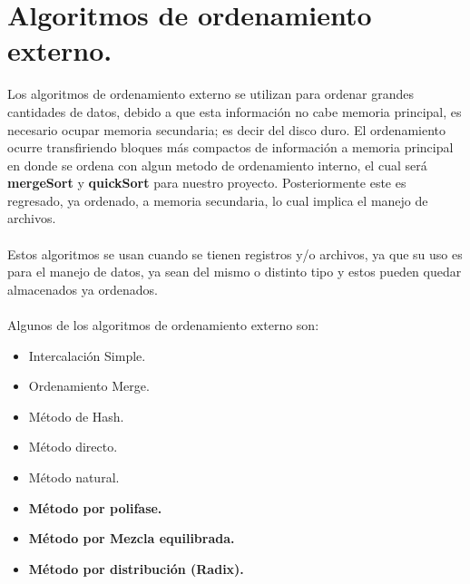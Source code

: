 \documentclass[12pt,letterpaper]{report}
\begin{document}
\section*{Algoritmos de ordenamiento externo.}
Los algoritmos de ordenamiento externo se utilizan para ordenar grandes cantidades de datos, debido a que esta información no cabe memoria principal, es necesario ocupar memoria secundaria; es decir del disco duro. El ordenamiento ocurre transfiriendo bloques más compactos de información a memoria principal en donde se ordena con algun metodo de ordenamiento interno, el cual será \textbf{mergeSort} y \textbf{quickSort} para nuestro proyecto. Posteriormente este es regresado, ya ordenado, a memoria secundaria, lo cual implica el manejo de archivos. \\\\
Estos algoritmos se usan cuando se tienen registros y/o archivos, ya que su uso es para el manejo de datos, ya sean del mismo o distinto tipo y estos pueden quedar almacenados ya ordenados.\\\\
Algunos de los algoritmos de ordenamiento externo son:
\begin{itemize}
    \item Intercalación Simple.
	\item Ordenamiento Merge.
	\item Método de Hash.
	\item Método directo.
	\item Método natural.
	\item \textbf{Método por polifase.}
	\item \textbf{Método por Mezcla equilibrada.}
	\item \textbf{Método por distribución (Radix).}
\end{itemize}
\end{document}
